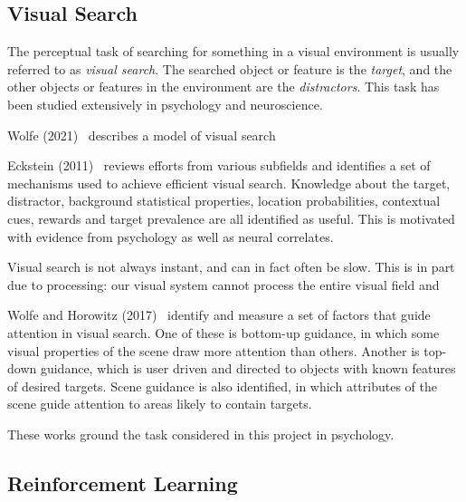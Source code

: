 \subsection{Visual Search}
\label{sec:visualsearch}


The perceptual task of searching for something in a visual environment is usually referred to as \textit{visual search}.
The searched object or feature is the \textit{target}, and the other objects or features in the environment are the \textit{distractors}.
This task has been studied extensively in psychology and neuroscience.

Wolfe (2021)~\cite{wolfe_guided_2021} describes a model of visual search


Eckstein (2011)~\cite{eckstein_visual_2011} reviews efforts from various subfields and identifies a set of mechanisms used to achieve efficient visual search.
Knowledge about the target, distractor, background statistical properties, location probabilities, contextual cues, rewards and target prevalence are all identified as useful.
This is motivated with evidence from psychology as well as neural correlates.

Visual search is not always instant, and can in fact often be slow.
This is in part due to processing: our visual system cannot process the entire visual field and 


Wolfe and Horowitz (2017)~\cite{wolfe_horowitz_2017} identify and measure a set of factors that guide attention in visual search.
One of these is bottom-up guidance, in which some visual properties of the scene draw more attention than others.
Another is top-down guidance, which is user driven and directed to objects with known features of desired targets.
Scene guidance is also identified, in which attributes of the scene guide attention to areas likely to contain targets. 

These works ground the task considered in this project in psychology.


\subsection{Reinforcement Learning}

